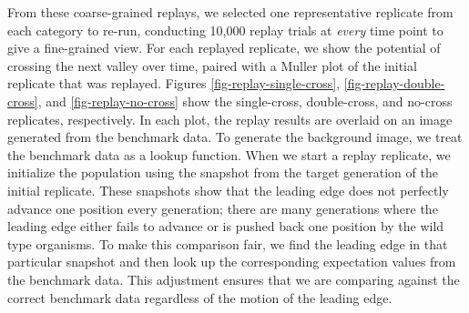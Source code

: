 From these coarse-grained replays, we selected one representative replicate from each category to re-run, conducting 10,000 replay trials at \textit{every} time point to give a fine-grained view. 
For each replayed replicate, we show the potential of crossing the next valley over time, paired with a Muller plot \citep{mullerGeneticAspectsSex1932} of the initial replicate that was replayed. 
Figures \ref{fig-replay-single-cross}, \ref{fig-replay-double-cross}, and \ref{fig-replay-no-cross} show the single-cross, double-cross, and no-cross replicates, respectively. 
In each plot, the replay results are overlaid on an image generated from the benchmark data. 
To generate the background image, we treat the benchmark data as a lookup function.
When we start a replay replicate, we initialize the population using the snapshot from the target generation of the initial replicate. 
These snapshots show that the leading edge does not perfectly advance one position every generation; there are many generations where the leading edge either fails to advance or is pushed back one position by the wild type organisms.
To make this comparison fair, we find the leading edge in that particular snapshot and then look up the corresponding expectation values from the benchmark data. 
This adjustment ensures that we are comparing against the correct benchmark data regardless of the motion of the leading edge. 


